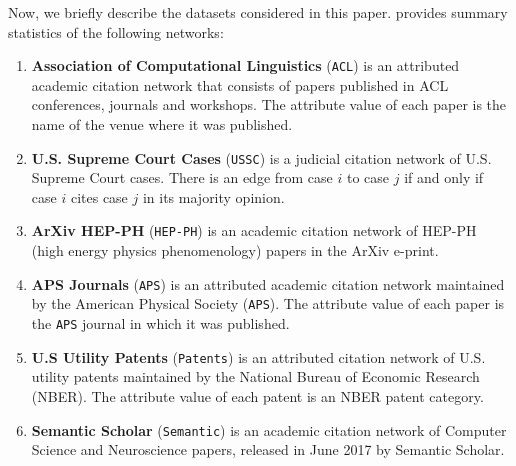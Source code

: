 Now, we briefly describe the datasets considered in this paper.
 provides summary statistics of the following networks:
\begin{enumerate}
    \item{\textbf{Association of Computational Linguistics}} (\texttt{ACL}) \cite{acldata} is an attributed academic citation network
    that consists of papers published in ACL conferences, journals and workshops.
    The attribute value of each paper is the name of the venue where it was published.


    \item{\textbf{U.S. Supreme Court Cases}} (\texttt{USSC}) \cite{fowler2008authority} is a judicial citation network of
    U.S. Supreme Court cases. There is an edge from case $i$ to case $j$ if and only if case $i$ cites case $j$ in its majority opinion.

    \item{\textbf{ArXiv HEP-PH}} (\texttt{HEP-PH}) \cite{gehrke2003overview} is an academic citation network of HEP-PH (high energy
    physics phenomenology) papers in the ArXiv e-print.

    \item{\textbf{APS Journals}} (\texttt{APS}) is an attributed academic citation network maintained by
    the American Physical Society (\texttt{APS}).
    The attribute value of each paper is the \texttt{APS} journal in which it was published.

    \item{\textbf{U.S Utility Patents}} (\texttt{Patents}) \cite{leskovec2005graphs} is an attributed citation network of U.S. utility patents maintained by
    the National Bureau of Economic Research (NBER).
    The attribute value of each patent is an NBER patent category.

    \item{\textbf{Semantic Scholar}} (\texttt{Semantic}) \cite{ammar} is an academic citation network of
    Computer Science and Neuroscience papers, released in June 2017 by Semantic Scholar.
\end{enumerate}

